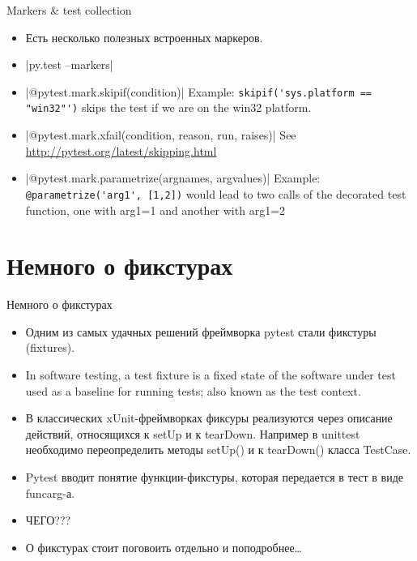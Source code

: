\documentclass{beamer}
\begin{document}
\begin{frame}[fragile]{Markers \& test collection}
    \begin{itemize}
    \item Есть несколько полезных встроенных маркеров.
    \pause \item {}|py.test --markers|
    \pause \item {}|@pytest.mark.skipif(condition)|
        Example: \verb|skipif('sys.platform == "win32"')| skips the test if we are on the win32 platform.
    \pause \item {}|@pytest.mark.xfail(condition, reason, run, raises)|
        See \url{http://pytest.org/latest/skipping.html}
    \pause \item {}|@pytest.mark.parametrize(argnames, argvalues)|
        Example: \verb|@parametrize('arg1', [1,2])| would lead to two calls of the decorated test function, one with arg1=1 and another with arg1=2
    \end{itemize}
\end{frame}

\section{Немного о фикстурах}
\begin{frame}[fragile]{Немного о фикстурах}
    \begin{itemize}
    \item Одним из самых удачных решений фреймворка pytest стали фикстуры (fixtures).
    \pause \item In software testing, a test fixture is a fixed state of the software
    under test used as a baseline for running tests; also known as the test context.
    \pause \item В классических xUnit-фреймворках фиксуры реализуются через описание действий, относящихся к setUp и к tearDown.
    Например в unittest необходимо переопределить методы setUp() и к tearDown() класса TestCase.
    \pause \item Pytest вводит понятие функции-фикстуры, которая передается в тест в виде funcarg-а.
    \pause \item ЧЕГО???
    \pause \item О фикстурах стоит поговоить отдельно и поподробнее\ldots
    \end{itemize}
\end{frame}
\end{document}
